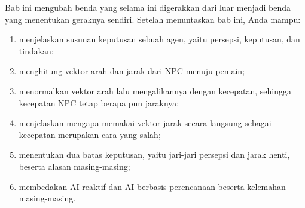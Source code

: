 \begin{tujuanbox}
Bab ini mengubah benda yang selama ini digerakkan dari luar menjadi benda yang
menentukan geraknya sendiri. Setelah menuntaskan bab ini, Anda mampu:
\begin{enumerate}
  \item menjelaskan susunan keputusan sebuah agen, yaitu persepsi, keputusan,
        dan tindakan;
  \item menghitung vektor arah dan jarak dari NPC menuju pemain;
  \item menormalkan vektor arah lalu mengalikannya dengan kecepatan, sehingga
        kecepatan NPC tetap berapa pun jaraknya;
  \item menjelaskan mengapa memakai vektor jarak secara langsung sebagai
        kecepatan merupakan cara yang salah;
  \item menentukan dua batas keputusan, yaitu jari-jari persepsi dan jarak
        henti, beserta alasan masing-masing;
  \item membedakan AI reaktif dan AI berbasis perencanaan beserta kelemahan
        masing-masing.
\end{enumerate}
\end{tujuanbox}
